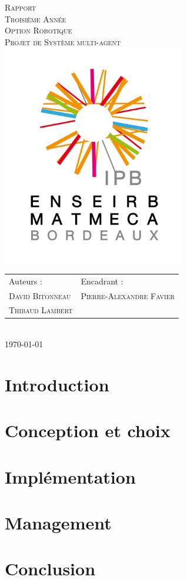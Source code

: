 \documentclass[a4paper, 11pt]{report}
\begin{document}
\begin{titlepage}
  \begin{center}
      \textsc{\huge Rapport\\[0.2cm]Troisième Année\\[0.2cm]Option
      Robotique}\\[\stretch{1}]
      \textsc{\Huge Projet de Système multi-agent}\\[\stretch{1}]
      \includegraphics[width=8cm]{logo-IPB.jpg}\\[\stretch{1}]
	\begin{tabular*}{\textwidth}{@{} m{10cm} l}
		\large{Auteurs :} & \large{Encadrant :} \\[0.5cm]
	    \textsc{\Large David Bitonneau} & \textsc{\Large Pierre-Alexandre Favier} \\
	    \textsc{\Large Thibaud Lambert}\\ 
    \end{tabular*}
	\\[2cm]
    \textsc{\Large \today}\\

\end{center}

\end{titlepage}

\clearpage
\tableofcontents
\clearpage

\chapter{Introduction}


\chapter{Conception et choix}


\chapter{Implémentation}


\chapter{Management}


\chapter{Conclusion}

\end{document}
